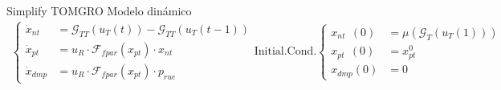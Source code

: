     \begin{model}{Simplify TOMGRO}
        Modelo dinámico
       \begin{gather}
           \begin{cases}
               \dot{x}_{nt}  &= \mathcal{G}_{TT}(u_T(t)) - \mathcal{G}_{TT}(u_T(t-1))  \\
               \dot{x}_{pt}  &  = u_R \cdot \mathcal{F}_{fpar}(x_{pt}) \cdot x_{nt} \\
               \dot{x}_{dmp} &  =  u_R  \cdot \mathcal{F}_{fpar}(x_{pt}) \cdot p_{rue}
           \end{cases}
           \text{Initial.Cond.}
           \begin{cases}
               x_{nt} \ \ (0)  & = \mu(\mathcal{G}_T(u_T(1)))  \\
               x_{pt} \ \ (0)  &  = x_{pt}^0 \\
               x_{dmp}(0) &  =  0
           \end{cases}
       \end{gather}        
       \end{model}
   